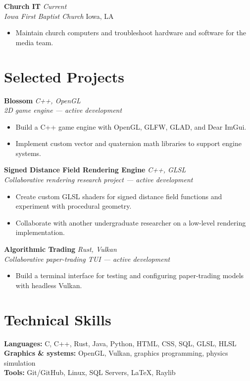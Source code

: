 \documentclass[10pt,letterpaper]{article}
\newcommand{\entry}[4]{
  \textbf{#1} \hfill \textit{#2}\\
  \textit{#3} \hfill #4\\[1.5pt]
}
\begin{document}
\entry{Church IT}{Current}{Iowa First Baptist Church}{Iowa, LA}
\begin{itemize}
  \item Maintain church computers and troubleshoot hardware and software for the media team.
\end{itemize}

\section{Selected Projects}
\textbf{Blossom} \hfill \textit{C++, OpenGL}\\
\textit{2D game engine --- active development}
\begin{itemize}
  \item Build a C++ game engine with OpenGL, GLFW, GLAD, and Dear ImGui.
  \item Implement custom vector and quaternion math libraries to support engine systems.
\end{itemize}

\textbf{Signed Distance Field Rendering Engine} \hfill \textit{C++, GLSL}\\
\textit{Collaborative rendering research project --- active development}
\begin{itemize}
  \item Create custom GLSL shaders for signed distance field functions and experiment with procedural geometry.
  \item Collaborate with another undergraduate researcher on a low-level rendering implementation.
\end{itemize}

\textbf{Algorithmic Trading} \hfill \textit{Rust, Vulkan}\\
\textit{Collaborative paper-trading TUI --- active development}
\begin{itemize}
  \item Build a terminal interface for testing and configuring paper-trading models with headless Vulkan.
\end{itemize}

\section{Technical Skills}
\textbf{Languages:} C, C++, Rust, Java, Python, HTML, CSS, SQL, GLSL, HLSL\\
\textbf{Graphics \& systems:} OpenGL, Vulkan, graphics programming, physics simulation\\
\textbf{Tools:} Git/GitHub, Linux, SQL Servers, LaTeX, Raylib
\end{document}
